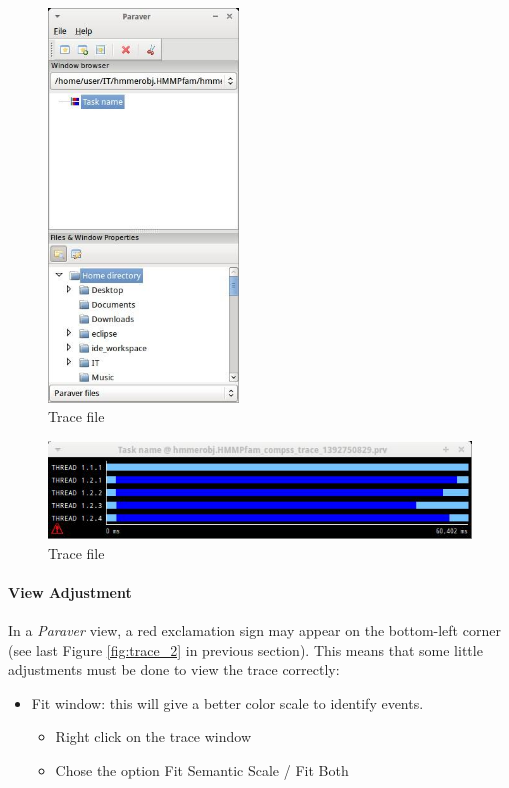 \begin{figure}[ht!]
  \centering
    \includegraphics[width=0.45\textwidth]{./Sections/4_Tools/Figures/1.jpeg}
    \caption{Trace file}
\end{figure}
\label{fig:trace_1}

\begin{figure}[ht!]
  \centering
    \includegraphics[width=1.0\textwidth]{./Sections/4_Tools/Figures/2.jpeg}
    \caption{Trace file}
\end{figure}
\label{fig:trace_2}

\paragraph{View Adjustment}
In a \textit{Paraver} view, a red exclamation sign may appear on the bottom-left corner (see last Figure \ref{fig:trace_2} in 
previous section). This means that some little adjustments must be done to view the trace correctly:

\begin{itemize}
 \item Fit window: this will give a better color scale to identify events.
	\begin{itemize}
	    \item Right click on the trace window
	    \item Chose the option Fit Semantic Scale / Fit Both
	\end{itemize}
\end{itemize}

